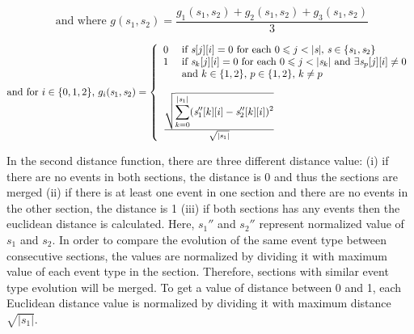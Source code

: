 $$\text{ and where } \textit{g}(\textit{s}_1,\textit{s}_2) = \frac{\textit{g}_1(\textit{s}_1,\textit{s}_2) + \textit{g}_2(\textit{s}_1,\textit{s}_2) + \textit{g}_3(\textit{s}_1,\textit{s}_2)}{3}$$

\[\text{and for } i  \in \{0,1,2\}\text{, } g_i(\textit{s}_1,\textit{s}_2) = \left\{
  \begin{array}{ll}
    0 & \text{ if } \textit{s}\lbrack j \rbrack\lbrack i \rbrack=0 \text{ for each } 0 \leqslant j < |\textit{s}|\text{, } \textit{s} \in \{\textit{s}_1,\textit{s}_2\}\\
    1 & \text{ if } \textit{s}_k\lbrack j \rbrack\lbrack i \rbrack=0 \text{ for each } 0 \leqslant j < |\textit{s}_k| \text{ and } \exists \textit{s}_p\lbrack j \rbrack\lbrack i \rbrack \neq 0\\
      & \text{ and } k \in \{1,2\} \text{, } p \in \{1,2\} \text{, } k \neq p\\
      & \\
	\multicolumn{2}{l}{\frac{\sqrt{\displaystyle\sum_{k=0}^{\lvert\textit{s}_1\lvert} (\textit{s}_1''\lbrack k \rbrack\lbrack i \rbrack - \textit{s}_2''\lbrack k \rbrack\lbrack i \rbrack)^2}}{\sqrt{\lvert\textit{s}_1\rvert}}}
  \end{array}
\right.
\]

In the second distance function, there are three different distance value: (i) if there are no events in both sections, the distance is 0 and thus the sections are merged (ii) if there is at least one event in one section and there are no events in the other section, the distance is 1 (iii) if both sections has any events then the euclidean distance is calculated. Here, $\textit{s}_1''$ and $\textit{s}_2''$ represent normalized value of $\textit{s}_1$ and $\textit{s}_2$. In order to compare the evolution of the same event type between consecutive sections, the values are normalized by dividing it with maximum value of each event type in the section. Therefore, sections with similar event type evolution will be merged. To get a value of distance between 0 and 1, each Euclidean distance value is normalized by dividing it with maximum distance $\sqrt{\lvert\textit{s}_1\rvert}$.

